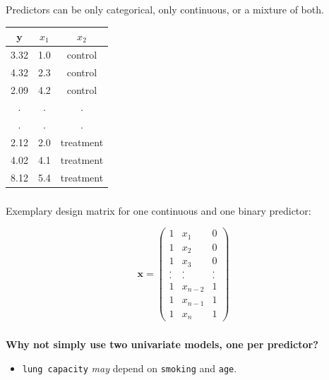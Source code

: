 \documentclass{beamer}
\begin{document}
\begin{frame}
  \frametitle{}
  Predictors can be only categorical, only continuous, or a mixture of both.
  \vspace{0.5cm}
  \begin{table}[h]
    \centering
    \begin{tabular}{ccc}
      \hline
      $\mathbf{y}$ & $x_1$ & $x_2$ \\
      \hline
      3.32 & 1.0 & control \\
      4.32 & 2.3 & control \\
      2.09 & 4.2 & control \\
      . & . & . \\
      . & . & . \\
      2.12 & 2.0 & treatment \\
      4.02 & 4.1 & treatment \\
      8.12 & 5.4 & treatment \\
      \hline
    \end{tabular}
  \end{table}
\end{frame}

\begin{frame}
  \frametitle{}
  Exemplary design matrix for one continuous and one binary predictor:
  
  \begin{equation*}
  \mathbf{x} = \left( \begin{array}{ccc} 1 & x_{1} & 0 \\ 1 & x_{2} & 0 \\ 1 & x_{3} & 0 \\ . & . & . \\ . & . & . \\ 1 & x_{n-2} & 1 \\ 1 & x_{n-1} & 1 \\ 1 & x_n & 1 \end{array}\right)
  \end{equation*}
\end{frame}

\begin{frame}
  \frametitle{}
  \textbf{Why not simply use two univariate models, one per predictor?}
  
  \begin{itemize}
    \item \texttt{lung capacity} \textit{may} depend on \texttt{smoking} and \texttt{age}.
  \end{itemize}
\end{frame}
\end{document}
